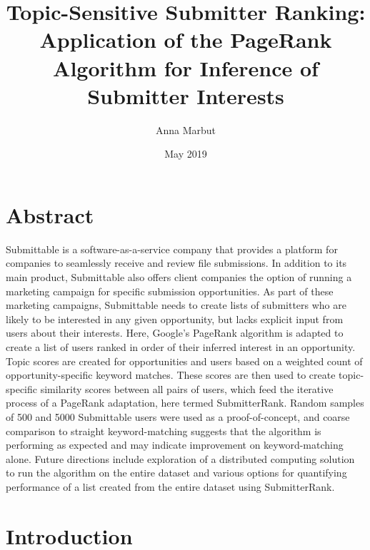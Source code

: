 \documentclass[12pt]{report}   %
\begin{document}
\title{%
Topic-Sensitive Submitter Ranking:\\[0.3em]
\large Application of the PageRank Algorithm for Inference of Submitter Interests}   %
\author{Anna Marbut}         %
\date{May 2019}    %
\maketitle


\chapter*{Abstract}
\label{abstract}

Submittable is a software-as-a-service company that provides a platform for companies to seamlessly receive and review file submissions. In addition to its main product, Submittable also offers client companies the option of running a marketing campaign for specific submission opportunities. As part of these marketing campaigns, Submittable needs to create lists of submitters who are likely to be interested in any given opportunity, but lacks explicit input from users about their interests. Here, Google's PageRank algorithm is adapted to create a list of users ranked in order of their inferred interest in an opportunity. Topic scores are created for opportunities and users based on a weighted count of opportunity-specific keyword matches. These scores are then used to create topic-specific similarity scores between all pairs of users, which feed the iterative process of a PageRank adaptation, here termed SubmitterRank. Random samples of 500 and 5000 Submittable users were used as a proof-of-concept, and coarse comparison to straight keyword-matching suggests that the algorithm is performing as expected and may indicate improvement on keyword-matching alone. Future directions include exploration of a distributed computing solution to run the algorithm on the entire dataset and various options for quantifying performance of a list created from the entire dataset using SubmitterRank.


\tableofcontents

\chapter{Introduction}
\end{document}
